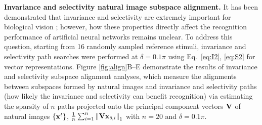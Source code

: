\documentclass[10pt,twocolumn,letterpaper]{article}
\begin{document}
{\bf Invariance and selectivity \vs natural image subspace alignment.} It has been demonstrated that invariance and selectivity are extremely important for biological vision \cite{desimone1991face, ito1995size}; however, how these properties directly affect the recognition performance of artificial neural networks remains unclear.
To address this question, starting from 16 randomly sampled reference stimuli, invariance and selectivity path searches {were} performed at $\delta = 0.1\pi$ using Eq.~\ref{eq:I2}, \ref{eq:S2} for vector representations. 
Figure \ref{fig:align}B--E demonstrate the results of invariance and selectivity subspace alignment analyses, which measure the alignments between subspaces formed by natural images and invariance and selectivity paths (\ie how likely the invariance and selectivity can benefit recognition) via estimating the sparsity of $n$ paths projected onto the principal component vectors $\bf{V}$ of natural images $\left\lbrace {\bf{x}}^{t} \right\rbrace$, \ie $\frac{1}{n}\sum_{i=1}^{n} \left\| {\bf{Vx}}_{\delta,i} \right\|_{1}$ with $n=20$ and $\delta=0.1\pi$.

\end{document}
